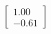 \documentclass[preview]{standalone}
\begin{document}
\begin{align*}
\begin{bmatrix} 1.00 \\ -0.61 \end{bmatrix}
\end{align*}
\end{document}
